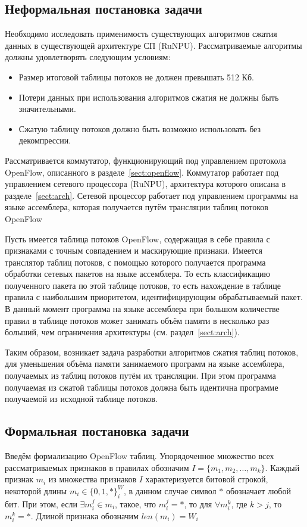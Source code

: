 \documentclass[oneside,final,12pt]{extarticle}
\begin{document}
    \subsection{Неформальная постановка задачи}
        Необходимо исследовать применимость существующих алгоритмов сжатия данных в существующей архитектуре СП (RuNPU).
        Рассматриваемые алгоритмы должны удовлетворять следующим условиям:
        \begin{itemize}
            \item Размер итоговой таблицы потоков не должен превышать 512 Кб.
            \item Потери данных при использования алгоритмов сжатия не должны быть значительными.
            \item Сжатую таблицу потоков должно быть возможно использовать без декомпрессии.
        \end{itemize}
    \fi
    Рассматривается коммутатор, функционирующий под управлением протокола OpenFlow,
    описанного в разделе~\ref{sect:openflow}. Коммутатор работает под управлением сетевого
    процессора (RuNPU), архитектура которого описана в разделе~\ref{sect:arch}.
    Сетевой процессор работает под управлением программы на языке ассемблера, которая получается 
    путём трансляции таблиц потоков OpenFlow

    Пусть имеется таблица потоков OpenFlow, содержащая в себе правила с признаками с 
    точным совпадением и маскирующие признаки. Имеется транслятор таблиц потоков, с помощью которого
    получается программа обработки сетевых пакетов на языке ассемблера. То есть классификацию 
    полученного пакета по этой таблице потоков, то есть нахождение в таблице правила 
    с наибольшим приоритетом, идентифицирующим обрабатываемый пакет. В данный момент
    программа на языке ассемблера при большом количестве правил в таблице потоков может занимать
    объём памяти в несколько раз больший, чем ограничения архитектуры (см. раздел~\ref{sect:arch}).

    Таким образом, возникает задача разработки алгоритмов сжатия таблиц потоков,
    для уменьшения объёма памяти занимаемого программ на языке ассемблера, получаемых из
    таблиц потоков путём их трансляции. При этом программа получаемая из сжатой таблицы потоков 
    должна быть идентична программе получаемой из исходной таблице потоков.

    
    \subsection{Формальная постановка задачи}
        Введём формализацию OpenFlow таблиц.
        Упорядоченное множество всех рассматриваемых признаков в правилах обозначим \(I=\{m_1,m_2,\ldots,m_k\}\). 
        Каждый признак \(m_i\) из множества признаков \(I\) характеризуется битовой строкой, некоторой длины \(m_i \in \{0, 1, *\}^W_i\),
        в данном случае символ \(*\) обозначает любой бит. При этом, если \(\exists m_i^j \in m_i\), такое, что 
        \( m_i^j = *\), то для \( \forall m_i^k \), где \(k > j\), то \( m_i^k = *\). Длиной признака обозначим \(len(m_i) = W_i\)
\end{document}
